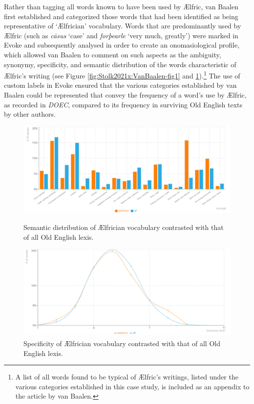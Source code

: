 Rather than tagging all words known to have been used by Ælfric, van Baalen first established and categorized those words that had been identified as being representative of `Ælfrician' vocabulary. Words that are predominantly used by Ælfric (such as \textit{cāsus} `case' and \textit{forþearle} `very much, greatly') were marked in Evoke and subsequently analysed in order to create an onomasiological profile, which allowed van Baalen to comment on such aspects as the ambiguity, synonymy, specificity, and semantic distribution of the words characteristic of Ælfric's writing (see Figure \ref{fig:Stolk2021x:VanBaalen-fig1} and \ref{fig:Stolk2021x:VanBaalen-fig2}).\footnote{A list of all words found to be typical of Ælfric's writings, listed under the various categories established in this case study, is included as an appendix to the article by van Baalen.} The use of custom labels in Evoke ensured that the various categories established by van Baalen could be represented that convey the frequency of a word's use by Ælfric, as recorded in \textit{DOEC}, compared to its frequency in surviving Old English texts by other authors.

\begin{figure}[htbp]
\centering
\begin{minipage}{.48\textwidth}
  \includegraphics[width=\textwidth]{Stolk2021x/fig/VanBaalen-categories.png}
	\caption[]{\label{fig:Stolk2021x:VanBaalen-fig1}Semantic distribution of Ælfrician vocabulary contrasted with that of all Old English lexis.}
\end{minipage}
\begin{minipage}{.04\textwidth}\end{minipage}
\begin{minipage}{.48\textwidth}
  \raggedleft
  \includegraphics[width=\textwidth]{Stolk2021x/fig/VanBaalen-specificity.png}
	\caption[]{\label{fig:Stolk2021x:VanBaalen-fig2}Specificity of Ælfrician vocabulary contrasted with that of all Old English lexis.}
\end{minipage}
\end{figure}

